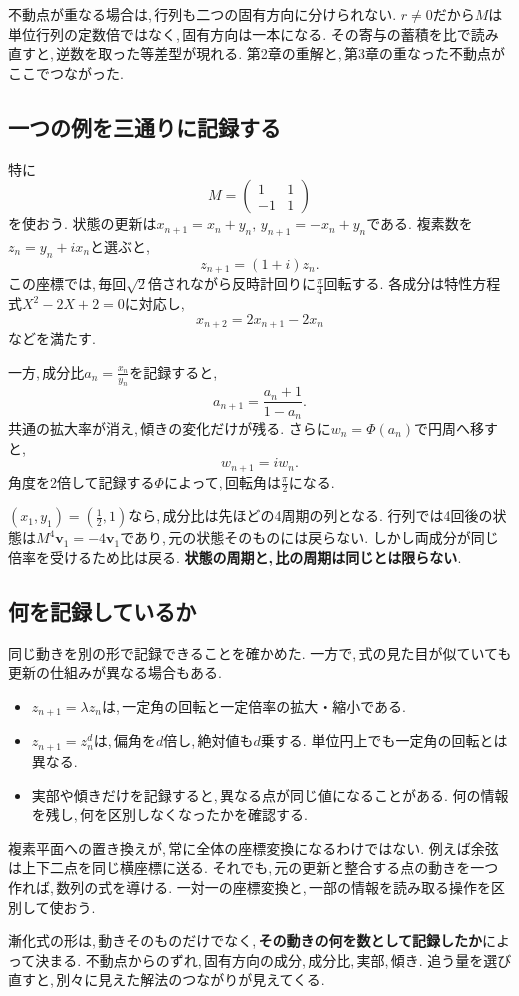 不動点が重なる場合は,\,行列も二つの固有方向に分けられない.
$r\ne0$だから$M$は単位行列の定数倍ではなく,\,固有方向は一本になる.
その寄与の蓄積を比で読み直すと,\,逆数を取った等差型が現れる.
第2章の重解と,\,第3章の重なった不動点がここでつながった.

\subsection{一つの例を三通りに記録する}

特に
\[
 M=\begin{pmatrix}1&1\\-1&1\end{pmatrix}
\]
を使おう.
状態の更新は$x_{n+1}=x_n+y_n,\,y_{n+1}=-x_n+y_n$である.
複素数を$z_n=y_n+ix_n$と選ぶと,
\[
 z_{n+1}=(1+i)z_n.
\]
この座標では,\,毎回$\sqrt2$倍されながら反時計回りに$\frac{\pi}{4}$回転する.
各成分は特性方程式$X^2-2X+2=0$に対応し,
\[
 x_{n+2}=2x_{n+1}-2x_n
\]
などを満たす.

一方,\,成分比$a_n=\frac{x_n}{y_n}$を記録すると,
\[
 a_{n+1}=\frac{a_n+1}{1-a_n}.
\]
共通の拡大率が消え,\,傾きの変化だけが残る.
さらに$w_n=\Phi(a_n)$で円周へ移すと,
\[
 w_{n+1}=iw_n.
\]
角度を2倍して記録する$\Phi$によって,\,回転角は$\frac{\pi}{2}$になる.

$(x_1,y_1)=(\frac12,1)$なら,\,成分比は先ほどの4周期の列となる.
行列では4回後の状態は$M^4\boldsymbol v_1=-4\boldsymbol v_1$であり,\,元の状態そのものには戻らない.
しかし両成分が同じ倍率を受けるため比は戻る.
\textbf{状態の周期と,\,比の周期は同じとは限らない}.

\subsection{何を記録しているか}

同じ動きを別の形で記録できることを確かめた.
一方で,\,式の見た目が似ていても更新の仕組みが異なる場合もある.

\begin{itemize}
 \item $z_{n+1}=\lambda z_n$は,\,一定角の回転と一定倍率の拡大・縮小である.
 \item $z_{n+1}=z_n^d$は,\,偏角を$d$倍し,\,絶対値も$d$乗する. 単位円上でも一定角の回転とは異なる.
 \item 実部や傾きだけを記録すると,\,異なる点が同じ値になることがある. 何の情報を残し,\,何を区別しなくなったかを確認する.
\end{itemize}

複素平面への置き換えが,\,常に全体の座標変換になるわけではない.
例えば余弦は上下二点を同じ横座標に送る.
それでも,\,元の更新と整合する点の動きを一つ作れば,\,数列の式を導ける.
一対一の座標変換と,\,一部の情報を読み取る操作を区別して使おう.

\begin{bookpoint}
漸化式の形は,\,動きそのものだけでなく,\,\textbf{その動きの何を数として記録したか}によって決まる.
不動点からのずれ,\,固有方向の成分,\,成分比,\,実部,\,傾き.
追う量を選び直すと,\,別々に見えた解法のつながりが見えてくる.
\end{bookpoint}
